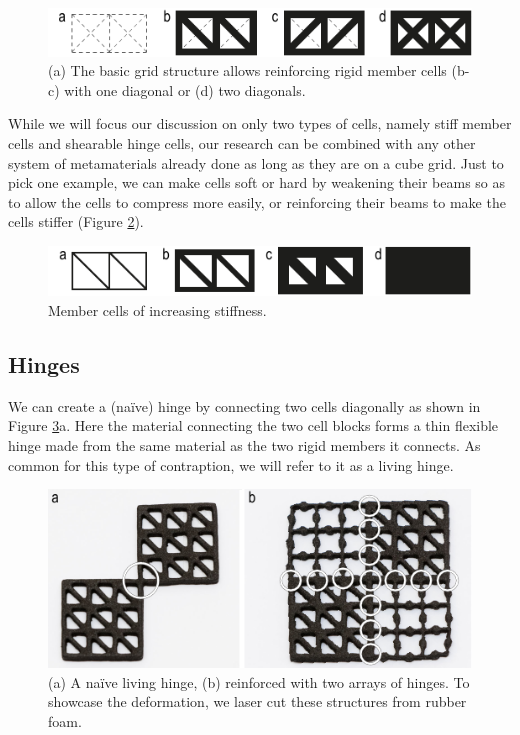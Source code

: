 \begin{figure} [h]
    \includegraphics[width=\textwidth]{chapters/metamaterial-mechanisms-FIG/3-basic-grid-structure.pdf}
    \caption[Short figure name.]{(a) The basic grid structure allows reinforcing rigid member cells (b-c) with one diagonal or (d) two diagonals.
    \label{fig:3-basic-grid-structure}}
\end{figure}

While we will focus our discussion on only two types of cells, namely stiff member cells and shearable hinge cells, our research can be combined with any other system of metamaterials already done as long as they are on a cube grid. Just to pick one example, we can make cells soft or hard \cite{Chu2008a} by weakening their beams so as to allow the cells to compress more easily, or reinforcing their beams to make the cells stiffer (Figure \ref{fig:4-cells-increasing-stiffness}). 

\begin{figure} [h]
    \includegraphics[width=\textwidth]{chapters/metamaterial-mechanisms-FIG/4-cells-increasing-stiffness.pdf}
    \caption[Short figure name.]{Member cells of increasing stiffness.
    \label{fig:4-cells-increasing-stiffness}}
\end{figure}


\subsection{Hinges}

We can create a (naïve) hinge by connecting two cells diagonally as shown in Figure \ref{fig:5-hinge-array}a. Here the material connecting the two cell blocks forms a thin flexible hinge made from the same material as the two rigid members it connects. As common for this type of contraption, we will refer to it as a living hinge.

\begin{figure} [h]
    \includegraphics[width=\textwidth]{chapters/metamaterial-mechanisms-FIG/5-hinge-array.pdf}
    \caption[Short figure name.]{(a) A naïve living hinge, (b) reinforced with two arrays of hinges. To showcase the deformation, we laser cut these structures from rubber foam.
    \label{fig:5-hinge-array}}
\end{figure}

